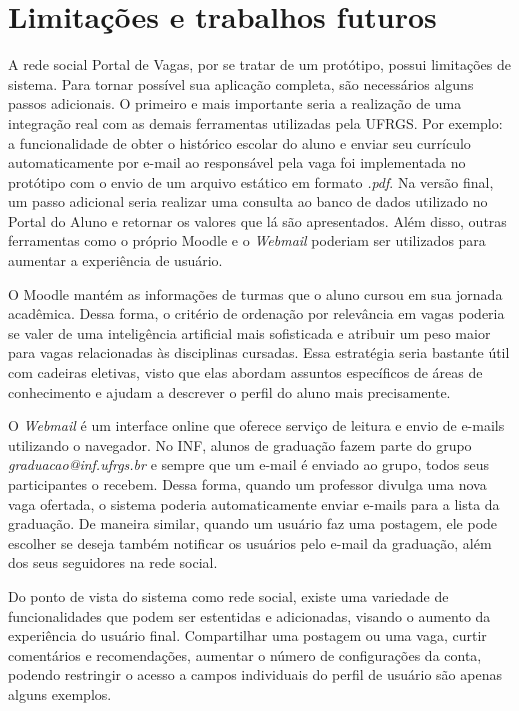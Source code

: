 \section{Limitações e trabalhos futuros}
\label{redeLimitacao}

A rede social Portal de Vagas, por se tratar de um protótipo, possui limitações de sistema. Para tornar possível sua aplicação completa, são necessários alguns passos adicionais. O primeiro e mais importante seria a realização de uma integração real com as demais ferramentas utilizadas pela UFRGS. Por exemplo: a funcionalidade de obter o histórico escolar do aluno e enviar seu currículo automaticamente por e-mail ao responsável pela vaga foi implementada no protótipo com o envio de um arquivo estático em formato \textit{.pdf}. Na versão final, um passo adicional seria realizar uma consulta ao banco de dados utilizado no Portal do Aluno e retornar os valores que lá são apresentados. Além disso, outras ferramentas como o próprio Moodle e o \textit{Webmail} poderiam ser utilizados para aumentar a experiência de usuário. 

O Moodle mantém as informações de turmas que o aluno cursou em sua jornada acadêmica. Dessa forma, o critério de ordenação por relevância em vagas poderia se valer de uma inteligência artificial mais sofisticada e atribuir um peso maior para vagas relacionadas às disciplinas cursadas. Essa estratégia seria bastante útil com cadeiras eletivas, visto que elas abordam assuntos específicos de áreas de conhecimento e ajudam a descrever o perfil do aluno mais precisamente. 

O \textit{Webmail} é um interface online que oferece serviço de leitura e envio de e-mails utilizando o navegador. No INF, alunos de graduação fazem parte do grupo \textit{graduacao@inf.ufrgs.br} e sempre que um e-mail é enviado ao grupo, todos seus participantes o recebem. Dessa forma, quando um professor divulga uma nova vaga ofertada, o sistema poderia automaticamente enviar e-mails para a lista da graduação. De maneira similar, quando um usuário faz uma postagem, ele pode escolher se deseja também notificar os usuários pelo e-mail da graduação, além dos seus seguidores na rede social.

Do ponto de vista do sistema como rede social, existe uma variedade de funcionalidades que podem ser estentidas e adicionadas, visando o aumento da experiência do usuário final. Compartilhar uma postagem ou uma vaga, curtir comentários e recomendações, aumentar o número de configurações da conta, podendo restringir o acesso a campos individuais do perfil de usuário são apenas alguns exemplos.

